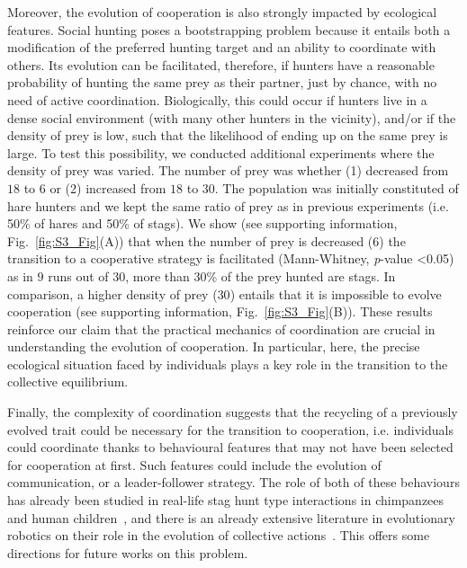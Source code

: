   Moreover, the evolution of cooperation is also strongly impacted by ecological features. Social hunting poses a bootstrapping problem because it entails both a modification of the preferred hunting target and an ability to coordinate with others. Its evolution can be facilitated, therefore, if hunters have a reasonable probability of hunting the same prey as their partner, just by chance, with no need of active coordination. Biologically, this could occur if hunters live in a dense social environment (with many other hunters in the vicinity), and/or if the density of prey is low, such that the likelihood of ending up on the same prey is large. To test this possibility, we conducted additional experiments where the density of prey was varied. The number of prey was whether (1) decreased from $18$ to $6$ or (2) increased from $18$ to $30$. The population was initially constituted of hare hunters and we kept the same ratio of prey as in previous experiments (i.e. 50\% of hares and 50\% of stags). We show (see supporting information, Fig.~\ref{fig:S3_Fig}(A)) that when the number of prey is decreased ($6$) the transition to a cooperative strategy is facilitated (Mann-Whitney, {\em p}-value \textless 0.05) as in $9$ runs out of $30$, more than $30$\% of the prey hunted are stags. In comparison, a higher density of prey ($30$) entails that it is impossible to evolve cooperation (see supporting information, Fig.~\ref{fig:S3_Fig}(B)). These results reinforce our claim that the practical mechanics of coordination are crucial in understanding the evolution of cooperation. In particular, here, the precise ecological situation faced by individuals plays a key role in the transition to the collective equilibrium.

  Finally, the complexity of coordination suggests that the recycling of a previously evolved trait could be necessary for the transition to cooperation, i.e. individuals could coordinate thanks to behavioural features that may not have been selected for cooperation at first. Such features could include the evolution of communication, or a leader-follower strategy. The role of both of these behaviours has already been studied in real-life stag hunt type interactions in chimpanzees and human children~\parencite{Bullinger2011, Duguid2014}, and there is an already extensive literature in evolutionary robotics on their role in the evolution of collective actions~\parencite{Trianni2007, Mitri2009, Solomon2012, Ferrante2015}. This offers some directions for future works on this problem.


